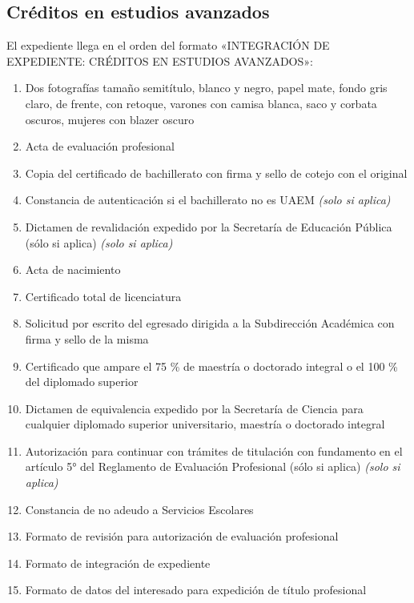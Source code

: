 \subsection{Créditos en estudios avanzados}
El expediente llega en el orden del formato «INTEGRACIÓN DE EXPEDIENTE: CRÉDITOS EN ESTUDIOS AVANZADOS»:
\begin{enumerate}
  \item Dos fotografías tamaño semitítulo, blanco y negro, papel mate, fondo gris claro, de frente, con retoque, varones con camisa blanca, saco y corbata oscuros, mujeres con blazer oscuro
  \item Acta de evaluación profesional
  \item Copia del certificado de bachillerato con firma y sello de cotejo con el original
  \item Constancia de autenticación si el bachillerato no es UAEM \emph{(solo si aplica)}
  \item Dictamen de revalidación expedido por la Secretaría de Educación Pública (sólo si aplica) \emph{(solo si aplica)}
  \item Acta de nacimiento
  \item Certificado total de licenciatura
  \item Solicitud por escrito del egresado dirigida a la Subdirección Académica con firma y sello de la misma
  \item Certificado que ampare el 75 \% de maestría o doctorado integral o el 100 \% del diplomado superior
  \item Dictamen de equivalencia expedido por la Secretaría de Ciencia para cualquier diplomado superior universitario, maestría o doctorado integral
  \item Autorización para continuar con trámites de titulación con fundamento en el artículo 5° del Reglamento de Evaluación Profesional (sólo si aplica) \emph{(solo si aplica)}
  \item Constancia de no adeudo a Servicios Escolares
  \item Formato de revisión para autorización de evaluación profesional
  \item Formato de integración de expediente
  \item Formato de datos del interesado para expedición de título profesional
\end{enumerate}
